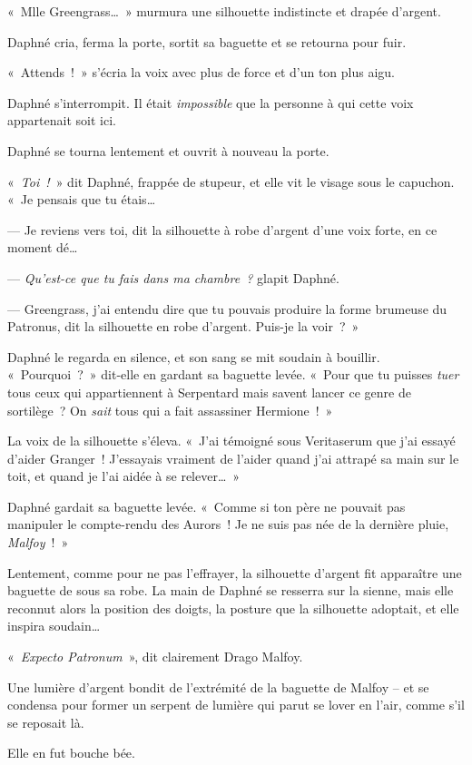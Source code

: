 «~Mlle Greengrass…~» murmura une silhouette indistincte et drapée d'argent.

Daphné cria, ferma la porte, sortit sa baguette et se retourna pour fuir.

«~Attends~!~» s'écria la voix avec plus de force et d'un ton plus aigu.

Daphné s'interrompit. Il était \emph{impossible} que la personne à qui cette voix appartenait soit ici.

Daphné se tourna lentement et ouvrit à nouveau la porte.

«~\emph{Toi~!}~» dit Daphné, frappée de stupeur, et elle vit le visage sous le capuchon. «~Je pensais que tu étais…

--- Je reviens vers toi, dit la silhouette à robe d'argent d'une voix forte, en ce moment dé…

--- \emph{Qu'est-ce que tu fais dans ma chambre~?} glapit Daphné.

--- Greengrass, j'ai entendu dire que tu pouvais produire la forme brumeuse du Patronus, dit la silhouette en robe d'argent. Puis-je la voir~?~»

Daphné le regarda en silence, et son sang se mit soudain à bouillir. «~Pourquoi~?~» dit-elle en gardant sa baguette levée. «~Pour que tu puisses \emph{tuer} tous ceux qui appartiennent à Serpentard mais savent lancer ce genre de sortilège~? On \emph{sait} tous qui a fait assassiner Hermione~!~»

La voix de la silhouette s'éleva. «~J'ai témoigné sous Veritaserum que j'ai essayé d'aider Granger~! J'essayais vraiment de l'aider quand j'ai attrapé sa main sur le toit, et quand je l'ai aidée à se relever…~»

Daphné gardait sa baguette levée. «~Comme si ton père ne pouvait pas manipuler le compte-rendu des Aurors~! Je ne suis pas née de la dernière pluie, \emph{Malfoy}~!~»

Lentement, comme pour ne pas l'effrayer, la silhouette d'argent fit apparaître une baguette de sous sa robe. La main de Daphné se resserra sur la sienne, mais elle reconnut alors la position des doigts, la posture que la silhouette adoptait, et elle inspira soudain…

«~\emph{Expecto Patronum}~», dit clairement Drago Malfoy.

Une lumière d'argent bondit de l'extrémité de la baguette de Malfoy -- et se condensa pour former un serpent de lumière qui parut se lover en l'air, comme s'il se reposait là.

Elle en fut bouche bée.

